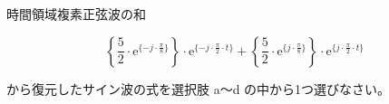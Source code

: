 時間領域複素正弦波の和

\[
\left \{ \frac{5}{2} \cdot \textrm{e}^{\{-j \cdot \frac{\pi}{8} \}} \right \} \cdot \textrm{e}^{\{-j \cdot \frac{\pi}{2} \cdot t \}} +  
\left \{ \frac{5}{2} \cdot \textrm{e}^{\{ j \cdot \frac{\pi}{8}  \}} \right \} \cdot \textrm{e}^{\{ j \cdot \frac{\pi}{2} \cdot t \}}
\]

\bigskip
\noindent から復元したサイン波の式を選択肢 a〜d の中から1つ選びなさい。

